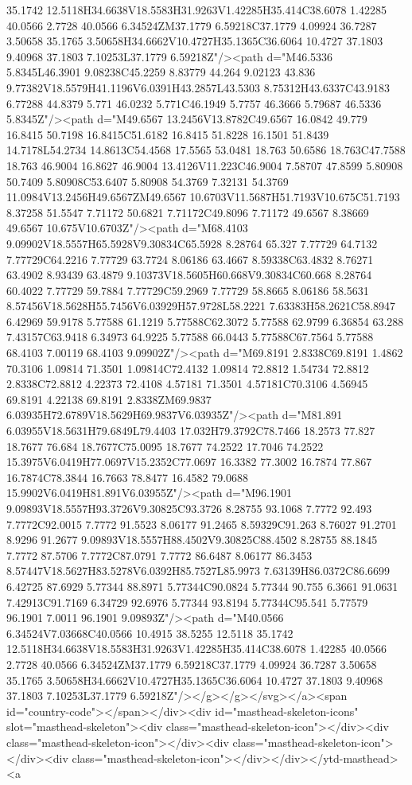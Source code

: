 {{{{{35.1742 12.5118H34.6638V18.5583H31.9263V1.42285H35.414C38.6078 1.42285 40.0566 2.7728 40.0566 6.34524ZM37.1779 6.59218C37.1779 4.09924 36.7287 3.50658 35.1765 3.50658H34.6662V10.4727H35.1365C36.6064 10.4727 37.1803 9.40968 37.1803 7.10253L37.1779 6.59218Z"/><path d="M46.5336 5.8345L46.3901 9.08238C45.2259 8.83779 44.264 9.02123 43.836 9.77382V18.5579H41.1196V6.0391H43.2857L43.5303 8.75312H43.6337C43.9183 6.77288 44.8379 5.771 46.0232 5.771C46.1949 5.7757 46.3666 5.79687 46.5336 5.8345Z"/><path d="M49.6567 13.2456V13.8782C49.6567 16.0842 49.779 16.8415 50.7198 16.8415C51.6182 16.8415 51.8228 16.1501 51.8439 14.7178L54.2734 14.8613C54.4568 17.5565 53.0481 18.763 50.6586 18.763C47.7588 18.763 46.9004 16.8627 46.9004 13.4126V11.223C46.9004 7.58707 47.8599 5.80908 50.7409 5.80908C53.6407 5.80908 54.3769 7.32131 54.3769 11.0984V13.2456H49.6567ZM49.6567 10.6703V11.5687H51.7193V10.675C51.7193 8.37258 51.5547 7.71172 50.6821 7.71172C49.8096 7.71172 49.6567 8.38669 49.6567 10.675V10.6703Z"/><path d="M68.4103 9.09902V18.5557H65.5928V9.30834C65.5928 8.28764 65.327 7.77729 64.7132 7.77729C64.2216 7.77729 63.7724 8.06186 63.4667 8.59338C63.4832 8.76271 63.4902 8.93439 63.4879 9.10373V18.5605H60.668V9.30834C60.668 8.28764 60.4022 7.77729 59.7884 7.77729C59.2969 7.77729 58.8665 8.06186 58.5631 8.57456V18.5628H55.7456V6.03929H57.9728L58.2221 7.63383H58.2621C58.8947 6.42969 59.9178 5.77588 61.1219 5.77588C62.3072 5.77588 62.9799 6.36854 63.288 7.43157C63.9418 6.34973 64.9225 5.77588 66.0443 5.77588C67.7564 5.77588 68.4103 7.00119 68.4103 9.09902Z"/><path d="M69.8191 2.8338C69.8191 1.4862 70.3106 1.09814 71.3501 1.09814C72.4132 1.09814 72.8812 1.54734 72.8812 2.8338C72.8812 4.22373 72.4108 4.57181 71.3501 4.57181C70.3106 4.56945 69.8191 4.22138 69.8191 2.8338ZM69.9837 6.03935H72.6789V18.5629H69.9837V6.03935Z"/><path d="M81.891 6.03955V18.5631H79.6849L79.4403 17.032H79.3792C78.7466 18.2573 77.827 18.7677 76.684 18.7677C75.0095 18.7677 74.2522 17.7046 74.2522 15.3975V6.0419H77.0697V15.2352C77.0697 16.3382 77.3002 16.7874 77.867 16.7874C78.3844 16.7663 78.8477 16.4582 79.0688 15.9902V6.0419H81.891V6.03955Z"/><path d="M96.1901 9.09893V18.5557H93.3726V9.30825C93.3726 8.28755 93.1068 7.7772 92.493 7.7772C92.0015 7.7772 91.5523 8.06177 91.2465 8.59329C91.263 8.76027 91.2701 8.9296 91.2677 9.09893V18.5557H88.4502V9.30825C88.4502 8.28755 88.1845 7.7772 87.5706 7.7772C87.0791 7.7772 86.6487 8.06177 86.3453 8.57447V18.5627H83.5278V6.0392H85.7527L85.9973 7.63139H86.0372C86.6699 6.42725 87.6929 5.77344 88.8971 5.77344C90.0824 5.77344 90.755 6.3661 91.0631 7.42913C91.7169 6.34729 92.6976 5.77344 93.8194 5.77344C95.541 5.77579 96.1901 7.0011 96.1901 9.09893Z"/><path d="M40.0566 6.34524V7.03668C40.0566 10.4915 38.5255 12.5118 35.1742 12.5118H34.6638V18.5583H31.9263V1.42285H35.414C38.6078 1.42285 40.0566 2.7728 40.0566 6.34524ZM37.1779 6.59218C37.1779 4.09924 36.7287 3.50658 35.1765 3.50658H34.6662V10.4727H35.1365C36.6064 10.4727 37.1803 9.40968 37.1803 7.10253L37.1779 6.59218Z"/></g></g></svg></a><span id="country-code"></span></div><div id="masthead-skeleton-icons" slot="masthead-skeleton"><div class="masthead-skeleton-icon"></div><div class="masthead-skeleton-icon"></div><div class="masthead-skeleton-icon"></div><div class="masthead-skeleton-icon"></div></div></ytd-masthead><a }}}}}
